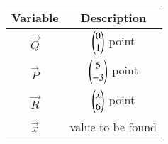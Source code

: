 \begin{tabular}[12pt]{ |c| c|}
    \hline
    \textbf{Variable} & \textbf{Description}\\ 
    \hline
	$\vec{Q}$ & $\begin{pmatrix}0\\1\end{pmatrix}$ point\\
    \hline
	$\vec{P}$ & $\begin{pmatrix}5\\-3\end{pmatrix}$ point\\
    \hline
	$\vec{R}$ & $\begin{pmatrix}x\\6\end{pmatrix}$ point\\
	\hline
	$\vec{x}$ & value to be found\\
   \hline
    \end{tabular}
